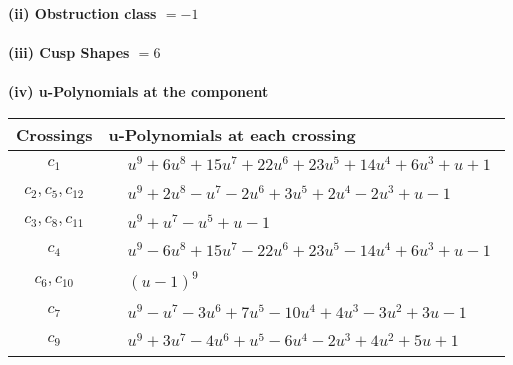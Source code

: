 \documentclass[1p]{elsarticle_modified}
\theoremstyle{definition}
\begin{document}
\flushleft \textbf{(ii) Obstruction class $= -1$}\\~\\
\flushleft \textbf{(iii) Cusp Shapes $= 6$}\\~\\
\newpage\renewcommand{\arraystretch}{1}
\flushleft \textbf{(iv) u-Polynomials at the component}\newline \\
\begin{tabular}{m{50pt}|m{274pt}}
Crossings & \hspace{64pt}u-Polynomials at each crossing \\
\hline $$\begin{aligned}c_{1}\end{aligned}$$&$\begin{aligned}
&u^9+6 u^8+15 u^7+22 u^6+23 u^5+14 u^4+6 u^3+u+1
\end{aligned}$\\
\hline $$\begin{aligned}c_{2},c_{5},c_{12}\end{aligned}$$&$\begin{aligned}
&u^9+2 u^8- u^7-2 u^6+3 u^5+2 u^4-2 u^3+u-1
\end{aligned}$\\
\hline $$\begin{aligned}c_{3},c_{8},c_{11}\end{aligned}$$&$\begin{aligned}
&u^9+u^7- u^5+u-1
\end{aligned}$\\
\hline $$\begin{aligned}c_{4}\end{aligned}$$&$\begin{aligned}
&u^9-6 u^8+15 u^7-22 u^6+23 u^5-14 u^4+6 u^3+u-1
\end{aligned}$\\
\hline $$\begin{aligned}c_{6},c_{10}\end{aligned}$$&$\begin{aligned}
&(u-1)^9
\end{aligned}$\\
\hline $$\begin{aligned}c_{7}\end{aligned}$$&$\begin{aligned}
&u^9- u^7-3 u^6+7 u^5-10 u^4+4 u^3-3 u^2+3 u-1
\end{aligned}$\\
\hline $$\begin{aligned}c_{9}\end{aligned}$$&$\begin{aligned}
&u^9+3 u^7-4 u^6+u^5-6 u^4-2 u^3+4 u^2+5 u+1
\end{aligned}$\\
\hline
\end{tabular}\\~\\
\end{document}
